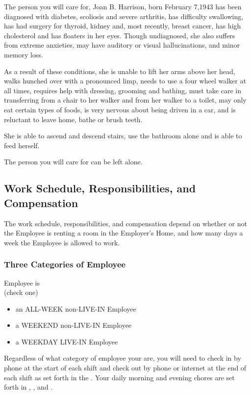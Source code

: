\documentclass[]{article}
\newcommand{\checkbox}{\raisebox{2pt}{\framebox[12pt][c]{\rule[7pt]{0pt}{-.3\baselineskip}}}}
\newcommand{\mom}{Joan B. Harrison}
\newcommand{\allweek}{ALL-WEEK non-LIVE-IN Employee}
\newcommand{\weekend}{WEEKEND non-LIVE-IN Employee}
\newcommand{\weekday}{WEEKDAY LIVE-IN Employee}
\begin{document}
The person you will care for, \mom{}, born February 7,1943 has been diagnosed with diabetes, scoliosis and severe arthritis, has difficulty swallowing, has had surgery for thyroid, kidney and, most recently, breast cancer, has high cholesterol and has floaters in her eyes. Though undiagnosed, she also suffers from extreme anxieties, may have auditory or visual hallucinations, and minor memory loss.

As a result of these conditions, she is unable to lift her arms above her head, walks hunched over with a pronounced limp, needs to use a four wheel walker at all times, requires help with dressing, grooming and bathing, must take care in transferring from a chair to her walker and from her walker to a toilet, may only eat certain types of foods, is very nervous about being driven in a car, and is reluctant to leave home, bathe or brush teeth.

She is able to ascend and descend stairs, use the bathroom alone and is able to feed herself.

The person you will care for can be left alone.

\subsection*{Work Schedule, Responsibilities, and Compensation}
The work schedule, responsibilities, and compensation depend on whether or not the Employee is renting a room in the Employer's Home, and how many days a week the Employee is allowed to work.

\subsubsection*{Three Categories of Employee}

\noindent Employee is\\
\noindent(check one)
\begin{itemize}
	\item[\checkbox] an \allweek{}
	\item[\checkbox] a \weekend{}
	\item[\checkbox] a \weekday{}
\end{itemize}

Regardless of what category of employee your are, you will need to check in by phone at the start of each shift and check out by phone or internet at the end of each shift as set forth in the . Your daily morning and evening chores are set forth in \basic{}, \bathroom{}, and \shopping{}. 
\end{document}
